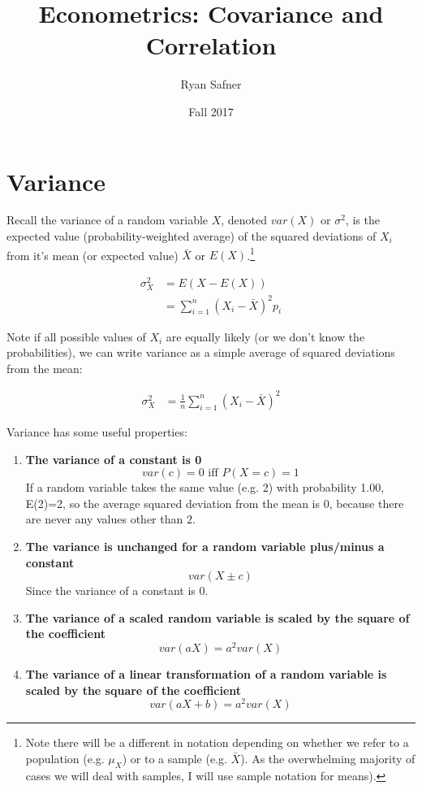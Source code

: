 \documentclass{article}
\title{Econometrics: Covariance and Correlation}
\author{Ryan Safner}
\date{Fall 2017}
\begin{document}
	\maketitle
	
\section{Variance }
Recall the variance of a random variable $X$, denoted $var(X)$ or $\sigma^2$, is the expected value (probability-weighted average) of the squared deviations of $X_i$ from it's mean (or expected value) $\bar{X}$ or $E(X)$.\footnote{Note there will be a different in notation depending on whether we refer to a population (e.g. $\mu_{X}$) or to a sample (e.g. $\bar{X}$). As the overwhelming majority of cases we will deal with samples, I will use sample notation for means).} 

\begin{align*}
\sigma_X^2&=E(X-E(X))\\
&=\sum^n_{i=1} (X_i-\bar{X})^2 p_i
\end{align*}

Note if all possible values of $X_i$ are equally likely (or we don't know the probabilities), we can write variance as a simple average of squared deviations from the mean:  

\begin{align*}
\sigma_X^2&=\frac{1}{n}\sum^n_{i=1}(X_i-\bar{X})^2 	
\end{align*}

Variance has some useful properties:
\begin{enumerate}
	\item 	\textbf{The variance of a constant is 0}
\begin{equation*}
var(c)=0 \text{ iff } P(X=c)=1	
\end{equation*}
If a random variable takes the same value (e.g. 2) with probability 1.00, E(2)=2, so the average squared deviation from the mean is 0, because there are never any values other than 2.

\item \textbf{The variance is unchanged for a random variable plus/minus a constant}
\begin{equation*}
var(X\pm c)	
\end{equation*}
Since the variance of a constant is 0. 

\item \textbf{The variance of a scaled random variable is scaled by the square of the coefficient} 
\begin{equation*}
var(aX)=a^2var(X)	
\end{equation*}

\item \textbf{The variance of a linear transformation of a random variable is scaled by the square of the coefficient} 
\begin{equation*}
var(aX+b)=a^2var(X)	
\end{equation*}
\end{enumerate}
\end{document}
